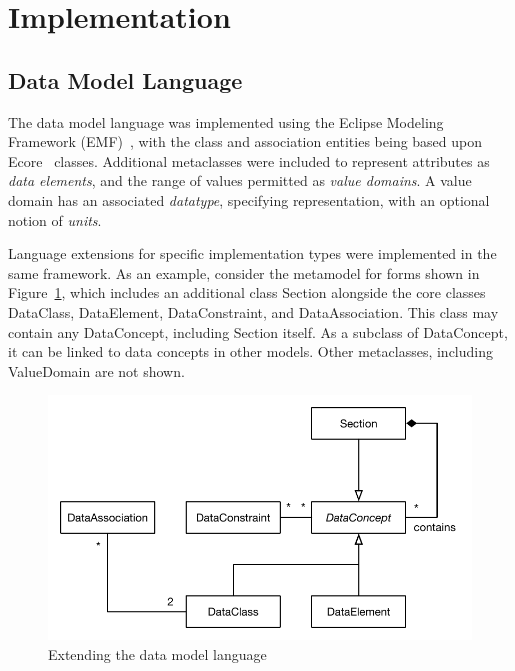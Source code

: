 \section{Implementation}

\let\plaintextsf=\textsf
\def\textsf#1{\plaintextsf{\small #1}}

\subsection{Data Model Language}

The data model language was implemented using the Eclipse Modeling
Framework (EMF)~\cite{EMF}, with the class and association entities
being based upon Ecore~\cite{ECORE} classes.  Additional metaclasses
were included to represent attributes as \emph{data elements}, and the
range of values permitted as \emph{value domains}.  A value domain has
an associated \emph{datatype}, specifying representation, with an
optional notion of \emph{units}.

Language extensions for specific implementation types were implemented
in the same framework.  As an example, consider the metamodel for
forms shown in Figure~\ref{fig:formsmodel}, which includes an
additional class \textsf{Section} alongside the core classes
\textsf{DataClass}, \textsf{DataElement}, \textsf{DataConstraint}, and
\textsf{DataAssociation}.  This class may \textsf{contain} any
\textsf{DataConcept}, including \textsf{Section} itself.  As a
subclass of \textsf{DataConcept}, it can be linked to data concepts in
other models.  Other metaclasses, including \textsf{ValueDomain} are
not shown.

\begin{figure}[h]
  \centering
  \includegraphics[width=\columnwidth]{ASEFigs/languageExtensionExample}
  \caption{Extending the data model language}
  \label{fig:formsmodel}
\end{figure}

